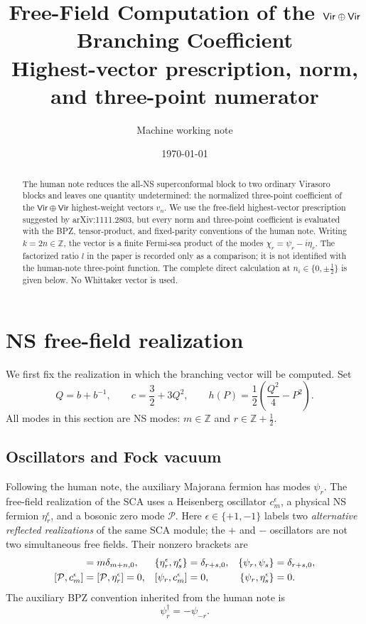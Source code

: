 \documentclass[11pt]{article}
\title{Free-Field Computation of the
\(\Vir\oplus\Vir\) Branching Coefficient\\[0.3em]
\large Highest-vector prescription, norm, and three-point numerator}
\author{Machine working note}
\date{\today}
\newcommand{\Vir}{\mathsf{Vir}}
\begin{document}
\maketitle

\begin{abstract}
The human note reduces the all-NS superconformal block to two ordinary
Virasoro blocks and leaves one quantity undetermined:
the normalized three-point coefficient of the
\(\Vir\oplus\Vir\) highest-weight vectors \(v_n\).
We use the free-field highest-vector prescription suggested by
arXiv:1111.2803, but every norm and three-point coefficient is evaluated with
the BPZ, tensor-product, and fixed-parity conventions of the human note.
Writing \(k=2n\in\mathbb Z\), the vector is a finite Fermi-sea product of the
modes \(\chi_r=\psi_r-i\eta_r\).  The factorized ratio \(l\) in the paper is
recorded only as a comparison; it is not identified with the human-note
three-point function.  The complete direct calculation at
\(n_i\in\{0,\pm\frac12\}\) is given below.  No Whittaker vector is used.
\end{abstract}

\tableofcontents

\section{NS free-field realization}

We first fix the realization in which the branching vector will be computed.
Set
\begin{equation}
 Q=b+b^{-1},\qquad
 c=\frac32+3Q^2,\qquad
 h(P)=\frac12\left(\frac{Q^2}{4}-P^2\right).
 \label{eq:free-field-parameters}
\end{equation}
All modes in this section are NS modes:
\(m\in\mathbb Z\) and \(r\in\mathbb Z+\frac12\).

\subsection{Oscillators and Fock vacuum}

Following the human note, the auxiliary Majorana fermion has modes
\(\psi_r\).  The free-field realization of the SCA uses a Heisenberg
oscillator \(c_m^\epsilon\), a physical NS fermion \(\eta_r^\epsilon\), and
a bosonic zero mode \(\mathcal P\).
Here \(\epsilon\in\{+1,-1\}\) labels two \emph{alternative reflected
realizations} of the same SCA module; the \(+\) and \(-\) oscillators are not
two simultaneous free fields.  Their nonzero brackets are
\begin{align}
 [c_m^\epsilon,c_n^\epsilon]&=m\delta_{m+n,0},
 &\{\eta_r^\epsilon,\eta_s^\epsilon\}&=\delta_{r+s,0},
 &\{\psi_r,\psi_s\}&=\delta_{r+s,0},
 \label{eq:free-field-algebra}\\
 [\mathcal P,c_m^\epsilon]&=[\mathcal P,\eta_r^\epsilon]=0,
 &[\psi_r,c_m^\epsilon]&=0,
 &\{\psi_r,\eta_s^\epsilon\}&=0.
 \notag
\end{align}
The auxiliary BPZ convention inherited from the human note is
\begin{equation}
 \psi_r^\dagger=-\psi_{-r}.
 \label{eq:psi-BPZ}
\end{equation}
\end{document}
